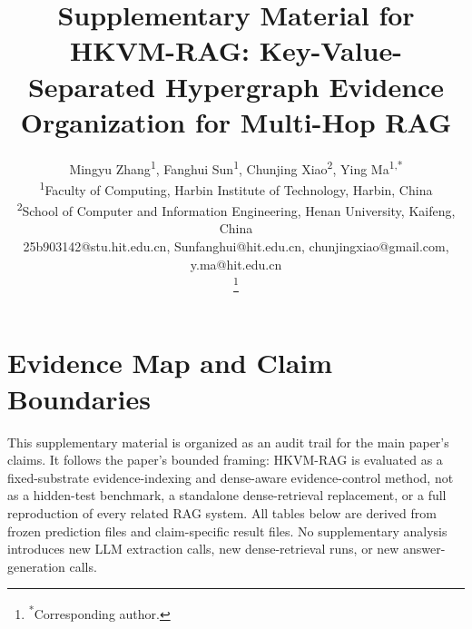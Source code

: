 \documentclass[conference]{IEEEtran}
\newcommand{\method}{HKVM-RAG}
\begin{document}
\title{Supplementary Material for \method: Key-Value-Separated Hypergraph Evidence Organization for Multi-Hop RAG}

\author{
    \parbox{\dimexpr\linewidth-2em}{
        \centering
        Mingyu Zhang\textsuperscript{1}, Fanghui Sun\textsuperscript{1}, Chunjing Xiao\textsuperscript{2}, Ying Ma\textsuperscript{1,*} \\
        \textsuperscript{1}Faculty of Computing, Harbin Institute of Technology, Harbin, China \\
        \textsuperscript{2}School of Computer and Information Engineering, Henan University, Kaifeng, China \\
        25b903142@stu.hit.edu.cn, Sunfanghui@hit.edu.cn, chunjingxiao@gmail.com, y.ma@hit.edu.cn
    }%
    \thanks{\textsuperscript{*}Corresponding author.}
}

\maketitle

\section{Evidence Map and Claim Boundaries}

This supplementary material is organized as an audit trail for the main paper's claims. It follows the paper's bounded framing: \method{} is evaluated as a fixed-substrate evidence-indexing and dense-aware evidence-control method, not as a hidden-test benchmark, a standalone dense-retrieval replacement, or a full reproduction of every related RAG system. All tables below are derived from frozen prediction files and claim-specific result files. No supplementary analysis introduces new LLM extraction calls, new dense-retrieval runs, or new answer-generation calls.
\end{document}

